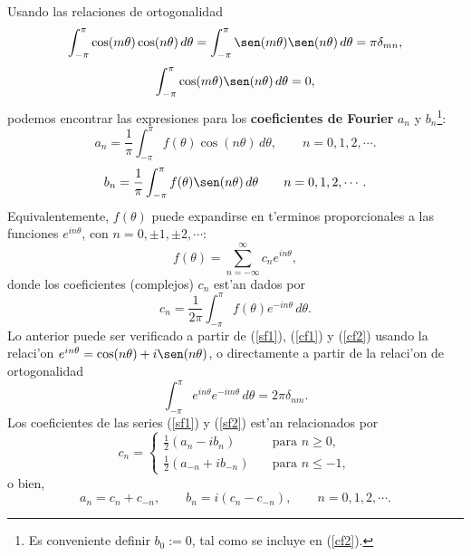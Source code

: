 Usando las relaciones de ortogonalidad 
\begin{equation}
\int_{-\pi}^\pi\cos(m\theta)\cos(n\theta)\,d\theta=\int_{-\pi}^\pi\sen(m\theta)\sen(n\theta)\,d\theta=\pi\delta_{mn},\label{eq:ortogo-sin-cos}
\end{equation}
\begin{equation}
\int_{-\pi}^\pi\cos(m\theta)\sen(n\theta)\,d\theta=0,
\end{equation}
podemos encontrar las expresiones para los \textbf{coeficientes de Fourier} $a_n$ y $b_n$\footnote{Es conveniente definir $b_0:=0$, tal como se incluye en (\ref{cf2}).}:
\begin{equation}\label{cf1}
a_n =\frac{1}{\pi}\int_{-\pi}^\pi f(\theta)\cos(n\theta)\,d\theta, \qquad n= 0, 1, 2,\cdots .
\end{equation}
\begin{equation}\label{cf2}
b_n =\frac{1}{\pi}\int_{-\pi}^\pi f(\theta)\sen(n\theta)\,d\theta  \qquad n= 0, 1, 2,\cdots .
\end{equation}
Equivalentemente, $f(\theta)$ puede expandirse en t'erminos proporcionales a las funciones $e^{i n\theta}$, con $n=0,\pm 1,\pm 2, \cdots$:
\begin{equation}\label{sf2}
f(\theta)=\sum_{n=-\infty}^\infty c_n e^{i n\theta},
\end{equation}
donde los coeficientes (complejos) $c_n$ est'an dados por
\begin{equation}
c_n =\frac{1}{2\pi}\int_{-\pi}^\pi f(\theta) e^{-in\theta}\,d\theta .
\end{equation}
Lo anterior puede ser verificado a partir de (\ref{sf1}), (\ref{cf1}) y (\ref{cf2}) usando la relaci'on $e^{in\theta}=\cos(n\theta)+i\sen(n\theta)$, o directamente a partir de la relaci'on de ortogonalidad
\begin{equation}
\int_{-\pi}^\pi e^{i n\theta} e^{-i m \theta}\,d\theta =2\pi\delta_{nm}.
\end{equation}
Los coeficientes de las series (\ref{sf1}) y (\ref{sf2}) est'an relacionados por
\begin{equation}c_n = 
\begin{cases}
\frac{1}{2}(a_n - i b_n)\quad &\text{para } n\geq 0,\\
\frac{1}{2}(a_{-n} + i b_{-n})\quad &\text{para } n\leq -1,
\end{cases}
\end{equation} 
o bien,
\begin{equation}
a_n=c_n+c_{-n}, \qquad b_n=i(c_n-c_{-n}), \qquad n=0,1,2,\cdots .
\end{equation}

